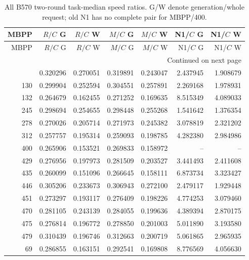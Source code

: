 \begingroup\small
\begin{longtable}{@{}rrrrrrr@{}}
\caption{All B570 two-round task-median speed ratios. G/W denote generation/whole request; old N1 has no complete pair for MBPP/400.}\label{tab:b570_task_cost}\\
\toprule
MBPP & $R/C$ G & $R/C$ W & $M/C$ G & $M/C$ W & N1/$C$ G & N1/$C$ W\\\midrule
\endfirsthead
\toprule
MBPP & $R/C$ G & $R/C$ W & $M/C$ G & $M/C$ W & N1/$C$ G & N1/$C$ W\\\midrule
\endhead
\midrule\multicolumn{7}{r}{Continued on next page}\\
\endfoot
\bottomrule
\endlastfoot
125 & 0.320296 & 0.270051 & 0.319891 & 0.243047 & 2.437945 & 1.908679\\
130 & 0.299904 & 0.252594 & 0.304551 & 0.257891 & 2.269168 & 1.978931\\
132 & 0.264679 & 0.162455 & 0.271252 & 0.169635 & 8.515349 & 4.089033\\
245 & 0.298694 & 0.254655 & 0.298448 & 0.255268 & 1.541642 & 1.376354\\
278 & 0.270026 & 0.205714 & 0.271973 & 0.245382 & 3.078819 & 2.321202\\
312 & 0.257757 & 0.195314 & 0.259093 & 0.198785 & 4.282380 & 2.984986\\
400 & 0.265906 & 0.153521 & 0.269833 & 0.158972 & -- & --\\
429 & 0.276956 & 0.197973 & 0.281509 & 0.203527 & 3.441493 & 2.411608\\
435 & 0.260099 & 0.151096 & 0.266645 & 0.158111 & 6.873734 & 3.323427\\
446 & 0.305206 & 0.233673 & 0.306943 & 0.272100 & 2.479117 & 1.929448\\
451 & 0.273297 & 0.193117 & 0.276409 & 0.198226 & 4.774253 & 3.079460\\
470 & 0.281105 & 0.243139 & 0.284055 & 0.199636 & 4.389394 & 2.870175\\
475 & 0.276814 & 0.196772 & 0.278850 & 0.201003 & 5.011890 & 3.193580\\
479 & 0.310439 & 0.196746 & 0.312663 & 0.200719 & 5.061865 & 2.965935\\
69 & 0.286855 & 0.163151 & 0.292541 & 0.169808 & 8.776569 & 4.056630\\
\end{longtable}

\endgroup
